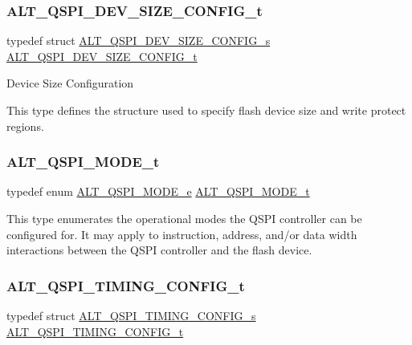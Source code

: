 \subsubsection{\texorpdfstring{ALT\_QSPI\_DEV\_SIZE\_CONFIG\_t}{ALT\_QSPI\_DEV\_SIZE\_CONFIG\_t}}
{\footnotesize\ttfamily typedef struct \mbox{\hyperlink{structALT__QSPI__DEV__SIZE__CONFIG__s}{A\+L\+T\+\_\+\+Q\+S\+P\+I\+\_\+\+D\+E\+V\+\_\+\+S\+I\+Z\+E\+\_\+\+C\+O\+N\+F\+I\+G\+\_\+s}}  \mbox{\hyperlink{group__ALT__QSPI__DEV__CFG_gaeeacf956659047dac90f9dde87817817}{A\+L\+T\+\_\+\+Q\+S\+P\+I\+\_\+\+D\+E\+V\+\_\+\+S\+I\+Z\+E\+\_\+\+C\+O\+N\+F\+I\+G\+\_\+t}}}

Device Size Configuration

This type defines the structure used to specify flash device size and write protect regions. \mbox{\label{group__ALT__QSPI__DEV__CFG_ga4d03e307842e1ed33be0039a56ef62c3}} 
\subsubsection{\texorpdfstring{ALT\_QSPI\_MODE\_t}{ALT\_QSPI\_MODE\_t}}
{\footnotesize\ttfamily typedef enum \mbox{\hyperlink{group__ALT__QSPI__DEV__CFG_ga9270168a24ae2256573f5c8cbc5ec691}{A\+L\+T\+\_\+\+Q\+S\+P\+I\+\_\+\+M\+O\+D\+E\+\_\+e}}  \mbox{\hyperlink{group__ALT__QSPI__DEV__CFG_ga4d03e307842e1ed33be0039a56ef62c3}{A\+L\+T\+\_\+\+Q\+S\+P\+I\+\_\+\+M\+O\+D\+E\+\_\+t}}}

This type enumerates the operational modes the Q\+S\+PI controller can be configured for. It may apply to instruction, address, and/or data width interactions between the Q\+S\+PI controller and the flash device. \mbox{\label{group__ALT__QSPI__DEV__CFG_ga81b5f892a981d0ecb8fb454b3a1e1230}} 
\subsubsection{\texorpdfstring{ALT\_QSPI\_TIMING\_CONFIG\_t}{ALT\_QSPI\_TIMING\_CONFIG\_t}}
{\footnotesize\ttfamily typedef struct \mbox{\hyperlink{structALT__QSPI__TIMING__CONFIG__s}{A\+L\+T\+\_\+\+Q\+S\+P\+I\+\_\+\+T\+I\+M\+I\+N\+G\+\_\+\+C\+O\+N\+F\+I\+G\+\_\+s}}  \mbox{\hyperlink{group__ALT__QSPI__DEV__CFG_ga81b5f892a981d0ecb8fb454b3a1e1230}{A\+L\+T\+\_\+\+Q\+S\+P\+I\+\_\+\+T\+I\+M\+I\+N\+G\+\_\+\+C\+O\+N\+F\+I\+G\+\_\+t}}}

